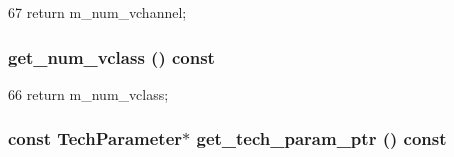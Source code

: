 \begin{DoxyCode}
67 { return m_num_vchannel; }
\end{DoxyCode}
\hypertarget{classOrionConfig_a0ed55ecc19284bd411af0669a56e434e}{
\subsubsection[{get\_\-num\_\-vclass}]{ get\_\-num\_\-vclass () const}}
\label{classOrionConfig_a0ed55ecc19284bd411af0669a56e434e}



\begin{DoxyCode}
66 { return m_num_vclass; }
\end{DoxyCode}
\hypertarget{classOrionConfig_a13bf5badea826f4ab0ef88bf8893ca1e}{
\subsubsection[{get\_\-tech\_\-param\_\-ptr}]{\setlength{\rightskip}{0pt plus 5cm}const {\bf TechParameter}$\ast$ get\_\-tech\_\-param\_\-ptr () const}}
\label{classOrionConfig_a13bf5badea826f4ab0ef88bf8893ca1e}



